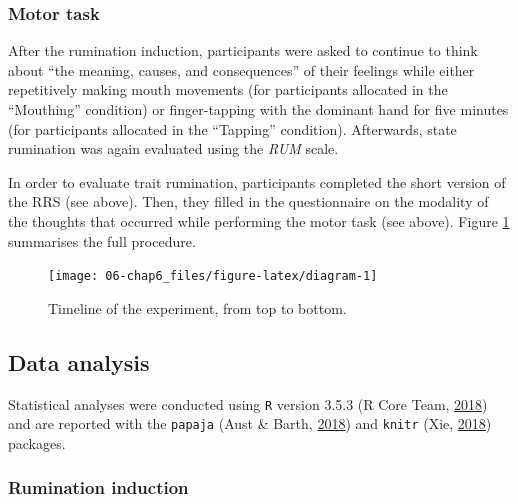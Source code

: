 \documentclass[a4paper,12pt,twoside,onecolumn,openright,final,oldfontcommands]{memoir}
\begin{document}
\hypertarget{proc_supp}{%
\subsubsection{Motor task}\label{proc_supp}}

After the rumination induction, participants were asked to continue to think about \enquote{the meaning, causes, and consequences} of their feelings while either repetitively making mouth movements (for participants allocated in the \enquote{Mouthing} condition) or finger-tapping with the dominant hand for five minutes (for participants allocated in the \enquote{Tapping} condition). Afterwards, state rumination was again evaluated using the \emph{RUM} scale.

In order to evaluate trait rumination, participants completed the short version of the RRS (see above). Then, they filled in the questionnaire on the modality of the thoughts that occurred while performing the motor task (see above). Figure \ref{fig:diagram} summarises the full procedure.

\begin{figure}[ht]

{\centering \texttt{[image: 06-chap6\_files/figure-latex/diagram-1]} 

}

\caption{Timeline of the experiment, from top to bottom.}\label{fig:diagram}
\end{figure}

\hypertarget{data-analysis-2}{%
\subsection{Data analysis}\label{data-analysis-2}}

Statistical analyses were conducted using \texttt{R} version 3.5.3 (R Core Team, \protect\hyperlink{ref-R-base}{2018}) and are reported with the \texttt{papaja} (Aust \& Barth, \protect\hyperlink{ref-R-papaja}{2018}) and \texttt{knitr} (Xie, \protect\hyperlink{ref-R-knitr}{2018}) packages.

\hypertarget{rumination-induction-2}{%
\subsubsection{Rumination induction}\label{rumination-induction-2}}
\end{document}
